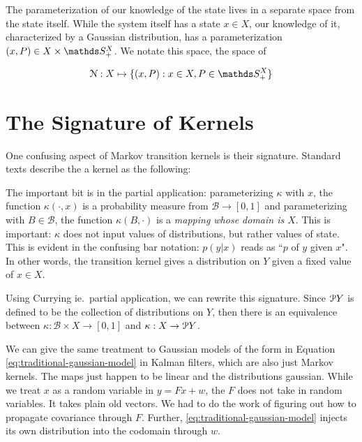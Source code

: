 The parameterization of our knowledge of the state lives in a separate space from the state itself.
While the system itself has a state $x\in X$, our knowledge of it, characterized by a Gaussian distribution, has a parameterization $(x,P)\in X\times \symmetric^X_+$.
We notate this space, the space of 


\begin{equation}
    \gaussian : X \mapsto \{(x,P) : x\in X, P \in \symmetric^X_+\}
\end{equation}

\section{The Signature of Kernels}
\label{sec:kernel-signature}

One confusing aspect of Markov transition kernels is their signature. 
Standard texts describe the a kernel as the following:


The important bit is in the partial application: parameterizing $\kappa$ with $x$, the function $\kappa(\cdot, x)$ is a probability measure from $\mathcal{B} \rightarrow [0,1]$ and parameterizing with $B\in \mathcal{B}$, the function $\kappa(B,\cdot)$ is a \emph{mapping whose domain is $X$}.
This is important: $\kappa$ does not input values of distributions, but rather values of state.
This is evident in the confusing bar notation: $p(y|x)$ reads as ``$p$ of $y$ given $x$".
In other words, the transition kernel gives a distribution on $Y$ given a fixed value of $x\in X$.

Using Currying ie.\ partial application, we can rewrite this signature. 
Since $\mathcal{P} Y$ is defined to be the collection of distributions on $Y$, then there is an equivalence between $\kappa : \mathcal{B} \times X \rightarrow [0,1]$ and $\kappa : X \rightarrow \mathcal{P} Y$.

We can give the same treatment to Gaussian models of the form in Equation \ref{eq:traditional-gaussian-model} in Kalman filters, which are also just Markov kernels. The maps just happen to be linear and the distributions gaussian.
While we treat $x$ as a random variable in $y = Fx + w$, the $F$ does not take in random variables.
It takes plain old vectors.
We had to do the work of figuring out how to propagate covariance through $F$.
Further, \ref{eq:traditional-gaussian-model} injects its own distribution into the codomain through $w$.

